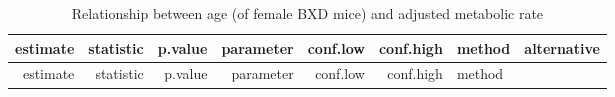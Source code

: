 \documentclass[]{article}
\begin{document}
\begin{longtable}[]{@{}rrrrrrll@{}}
\caption{Relationship between age (of female BXD mice) and adjusted
metabolic rate}\tabularnewline
\toprule
\begin{minipage}[b]{0.07\columnwidth}\raggedleft
estimate\strut
\end{minipage} & \begin{minipage}[b]{0.07\columnwidth}\raggedleft
statistic\strut
\end{minipage} & \begin{minipage}[b]{0.06\columnwidth}\raggedleft
p.value\strut
\end{minipage} & \begin{minipage}[b]{0.07\columnwidth}\raggedleft
parameter\strut
\end{minipage} & \begin{minipage}[b]{0.07\columnwidth}\raggedleft
conf.low\strut
\end{minipage} & \begin{minipage}[b]{0.07\columnwidth}\raggedleft
conf.high\strut
\end{minipage} & \begin{minipage}[b]{0.28\columnwidth}\raggedright
method\strut
\end{minipage} & \begin{minipage}[b]{0.09\columnwidth}\raggedright
alternative\strut
\end{minipage}\tabularnewline
\midrule
\endfirsthead
\toprule
\begin{minipage}[b]{0.07\columnwidth}\raggedleft
estimate\strut
\end{minipage} & \begin{minipage}[b]{0.07\columnwidth}\raggedleft
statistic\strut
\end{minipage} & \begin{minipage}[b]{0.06\columnwidth}\raggedleft
p.value\strut
\end{minipage} & \begin{minipage}[b]{0.07\columnwidth}\raggedleft
parameter\strut
\end{minipage} & \begin{minipage}[b]{0.07\columnwidth}\raggedleft
conf.low\strut
\end{minipage} & \begin{minipage}[b]{0.07\columnwidth}\raggedleft
conf.high\strut
\end{minipage} & \begin{minipage}[b]{0.28\columnwidth}\raggedright
method\strut
\end{minipage} & \begin{minipage}[b]{0.09\columnwidth}\raggedright

\end{minipage}
\end{longtable}
\end{document}
